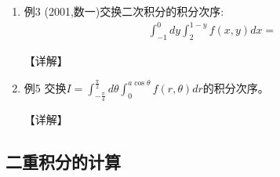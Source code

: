 \documentclass[12pt, a4paper, oneside, UTF8]{ctexbook}
\begin{document}
\begin{enumerate}[label=\arabic*.,start=3]
    \item 例3 (2001,数一)交换二次积分的积分次序:
    \begin{align*}
        \int_{-1}^0 dy\int_2^{1-y} f(x,y)dx=
    \end{align*}
    
    \begin{solution}
    【详解】
    \end{solution}
    
    \item 例5 交换$I=\int_{-\frac{\pi}{4}}^{\frac{\pi}{2}}d\theta\int_0^{a\cos\theta}f(r,\theta)dr$的积分次序。
    
    \begin{solution}
    【详解】
    \end{solution}
\end{enumerate}

\subsection{二重积分的计算}
\end{document}

